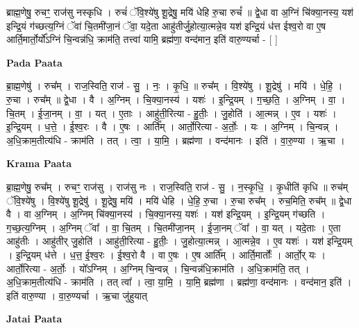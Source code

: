 \documentclass[17pt]{extarticle}
\begin{document}
ब्राह्म॒णेषु॒ रुचꣳ॒॒ राज॑सु नस्कृधि । रुचं॑ ॅवि॒श्ये॑षु शू॒द्रेषु॒ मयि॑ धेहि रु॒चा रुचं᳚ ॥ द्वे॒धा वा अ॒ग्निं चि॑क्या॒नस्य॒ यश॑ इन्द्रि॒यं ग॑च्छत्य॒ग्निं ॅवा॑ चि॒तमी॑जा॒नं ॅवा॒ यदे॒ता आहु॑तीर्जु॒होत्या॒त्मन्ने॒व यश॑ इन्द्रि॒यं ध॑त्त ईश्व॒रो वा ए॒ष आर्ति॒मार्तो॒र्यो᳚ऽग्निं चि॒न्वन्न॑धि॒ क्राम॑ति॒ तत्त्वा॑ यामि॒ ब्रह्म॑णा॒ वन्द॑मान॒ इति॑ वारु॒ण्यर्चा - [  ] \newline

\textbf{Pada Paata} \newline

ब्रा॒ह्म॒णेषु॑ । रुच᳚म् । राज॒स्विति॒ राज॑ - सु॒ । नः॒ । कृ॒धि॒ ॥ रुच᳚म् । वि॒श्ये॑षु । शू॒द्रेषु॑ । मयि॑ । धे॒हि॒ । रु॒चा । रुच᳚म् ॥ द्वे॒धा । वै । अ॒ग्निम् । चि॒क्या॒नस्य॑ । यशः॑ । इ॒न्द्रि॒यम् । ग॒च्छ॒ति॒ । अ॒ग्निम् । वा॒ । चि॒तम् । ई॒जा॒नम् । वा॒ । यत् । ए॒ताः । आहु॑ती॒रित्या - हु॒तीः॒ । जु॒होति॑ । आ॒त्मन्न् । ए॒व । यशः॑ । इ॒न्द्रि॒यम् । ध॒त्ते॒ । ई॒श्व॒रः । वै । ए॒षः । आर्ति᳚म् । आर्तो॒रित्या - अ॒र्तोः॒ । यः । अ॒ग्निम् । चि॒न्वन्न् । अ॒धि॒क्राम॒तीत्य॑धि - क्राम॑ति । तत् । त्वा॒ । या॒मि॒ । ब्रह्म॑णा । वन्द॑मानः । इति॑ । वा॒रु॒ण्या । ऋ॒चा ।  \newline


\textbf{Krama Paata} \newline

ब्रा॒ह्म॒णेषु॒ रुच᳚म् । रुचꣳ॒॒ राज॑सु । राज॑सु नः । राज॒स्विति॒ राज॑ - सु॒ । न॒स्कृ॒धि॒ । कृ॒धीति॑ कृधि ॥ रुच॑म् ॅवि॒श्ये॑षु । वि॒श्ये॑षु शू॒द्रेषु॑ । शू॒द्रेषु॒ मयि॑ । मयि॑ धेहि । धे॒हि॒ रु॒चा । रु॒चा रुच᳚म् । रुच॒मिति॒ रुच᳚म् ॥ द्वे॒धा वै । वा अ॒ग्निम् । अ॒ग्निम् चि॑क्या॒नस्य॑ । चि॒क्या॒नस्य॒ यशः॑ । यश॑ इन्द्रि॒यम् । इ॒न्द्रि॒यम् ग॑च्छति । ग॒च्छ॒त्य॒ग्निम् । अ॒ग्निम् ॅवा᳚ । वा॒ चि॒तम् । चि॒तमी॑जा॒नम् । ई॒जा॒नम् ॅवा᳚ । वा॒ यत् । यदे॒ताः । ए॒ता आहु॑तीः । आहु॑तीर् जु॒होति॑ । आहु॑ती॒रित्या - हु॒तीः॒ । जु॒होत्या॒त्मन्न् । आ॒त्मन्ने॒व । ए॒व यशः॑ । यश॑ इन्द्रि॒यम् । इ॒न्द्रि॒यम् ध॑त्ते । ध॒त्त॒ ई॒श्व॒रः । ई॒श्व॒रो वै । वा ए॒षः । ए॒ष आर्ति᳚म् । आर्ति॒मार्तोः᳚ । आर्तो॒र् यः । आर्तो॒रित्या - अ॒र्तोः॒ । यो᳚ऽग्निम् । अ॒ग्निम् चि॒न्वन्न् । चि॒न्वन्न॑धि॒क्राम॑ति । अ॒धि॒क्राम॑ति॒ तत् । अ॒धि॒क्राम॒तीत्य॑धि - क्राम॑ति । तत् त्वा᳚ । त्वा॒ या॒मि॒ । या॒मि॒ ब्रह्म॑णा । ब्रह्म॑णा॒ वन्द॑मानः । वन्द॑मान॒ इति॑ । इति॑ वारु॒ण्या । वा॒रु॒ण्यर्चा । ऋ॒चा जु॑हुयात् \newline

\textbf{Jatai Paata} \newline
\end{document}
